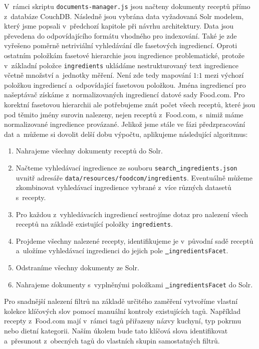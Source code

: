 V~rámci skriptu \texttt{documents-manager.js} jsou načteny dokumenty receptů přímo z~databáze CouchDB. Následně jsou vybrána data vyžadovaná Solr modelem, který jsme popsali v~předchozí kapitole při návrhu architektury. Data jsou převedena do odpovídajícího formátu vhodného pro indexování. Také je zde vyřešeno poměrně netriviální vyhledávání dle fasetových ingrediencí. Oproti ostatním položkám fasetové hierarchie jsou ingredience problematické, protože v~základní položce \texttt{ingredients} ukládáme nestrukturovaný text ingredience včetně množství a~jednotky měření. Není zde tedy mapování $1$:$1$ mezi výchozí položkou ingrediencí a~odpovídající fasetovou položkou. Jména ingrediencí pro našeptávač získáme z~normalizovaných ingrediencí datové sady Food.com. Pro korektní fasetovou hierarchii ale potřebujeme znát počet všech receptů, které jsou pod těmito jmény surovin nalezeny, nejen receptů z~Food.com, s~nimiž máme normalizované ingredience provázané. Jelikož jsme stále ve fázi předzpracování dat a~můžeme si dovolit delší dobu výpočtu, aplikujeme následující algoritmus:
\begin{enumerate}
    \item Nahrajeme všechny dokumenty receptů do Solr.
    \item Načteme vyhledávací ingredience ze souboru \texttt{search\underline{{ }}ingredients.json} uvnitř adresáře \texttt{data/resources/foodcom/ingredients}. Eventuálně můžeme zkombinovat vyhledávací ingredience vybrané z~více různých datasetů s~recepty.
    \item Pro každou z~vyhledávacích ingrediencí sestrojíme dotaz pro nalezení všech receptů na základě existující položky \texttt{ingredients}.
    \item Projdeme všechny nalezené recepty, identifikujeme je v~původní sadě receptů a~uložíme vyhledávací ingredienci do jejich pole \texttt{\underline{{ }}ingredientsFacet}.
    \item Odstraníme všechny dokumenty ze Solr.
    \item Nahrajeme dokumenty s~vyplněnými položkami \texttt{\underline{{ }}ingredientsFacet} do Solr.
\end{enumerate}

Pro snadnější nalezení filtrů na základě určitého zaměření vytvoříme vlastní kolekce klíčových slov pomocí manuální kontroly existujících tagů. Například recepty z~Food.com mají v~rámci tagů přiřazeny názvy kuchyní, typ pokrmu nebo dietní kategorii. Naším úkolem bude tato klíčová slova identifikovat a~přesunout z~obecných tagů do vlastních skupin samostatných filtrů.


